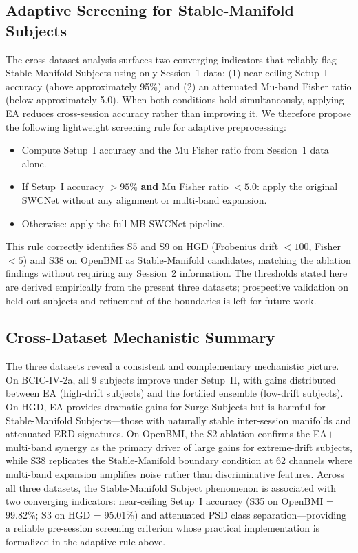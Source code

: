 \documentclass[conference]{IEEEtran}
\begin{document}
\subsection{Adaptive Screening for Stable-Manifold Subjects}

The cross-dataset analysis surfaces two converging indicators that reliably flag Stable-Manifold Subjects using only Session~1 data: (1) near-ceiling Setup~I accuracy (above approximately 95\%) and (2) an attenuated Mu-band Fisher ratio (below approximately 5.0). When both conditions hold simultaneously, applying EA reduces cross-session accuracy rather than improving it. We therefore propose the following lightweight screening rule for adaptive preprocessing:

\begin{itemize}
    \item Compute Setup~I accuracy and the Mu Fisher ratio from Session~1 data alone.
    \item If Setup~I accuracy $> 95\%$ \textbf{and} Mu Fisher ratio $< 5.0$: apply the original SWCNet without any alignment or multi-band expansion.
    \item Otherwise: apply the full MB-SWCNet pipeline.
\end{itemize}

This rule correctly identifies S5 and S9 on HGD (Frobenius drift $< 100$, Fisher $< 5$) and S38 on OpenBMI as Stable-Manifold candidates, matching the ablation findings without requiring any Session~2 information. The thresholds stated here are derived empirically from the present three datasets; prospective validation on held-out subjects and refinement of the boundaries is left for future work.

\subsection{Cross-Dataset Mechanistic Summary}

The three datasets reveal a consistent and complementary mechanistic picture. On BCIC-IV-2a, all 9 subjects improve under Setup~II, with gains distributed between EA (high-drift subjects) and the fortified ensemble (low-drift subjects). On HGD, EA provides dramatic gains for Surge Subjects but is harmful for Stable-Manifold Subjects---those with naturally stable inter-session manifolds and attenuated ERD signatures. On OpenBMI, the S2 ablation confirms the EA$+$multi-band synergy as the primary driver of large gains for extreme-drift subjects, while S38 replicates the Stable-Manifold boundary condition at 62 channels where multi-band expansion amplifies noise rather than discriminative features. Across all three datasets, the Stable-Manifold Subject phenomenon is associated with two converging indicators: near-ceiling Setup~I accuracy (S35 on OpenBMI = 99.82\%; S3 on HGD = 95.01\%) and attenuated PSD class separation---providing a reliable pre-session screening criterion whose practical implementation is formalized in the adaptive rule above.
\end{document}
